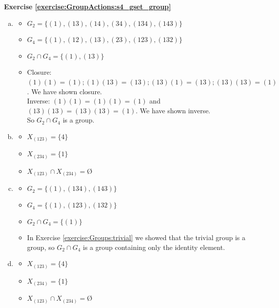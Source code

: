 \noindent\textbf{Exercise \ref{exercise:GroupActions:s4_gset_group}}
\begin{enumerate}[(a)]
\item
	\begin{itemize}
	\item
	$G_2 = \{(1), (13), (14), (34), (134), (143)\}$
	
	\item
	$G_4 = \{(1), (12), (13), (23), (123), (132)\}$
	
	\item
	$G_2 \cap G_4 = \{(1), (13)\}$
	
	\item
	Closure: $(1)(1) = (1); (1)(13) = (13); (13)(1) = (13); (13)(13) = (1)$. We have shown closure.
	\\
	Inverse: $(1)(1) = (1)(1) = (1)$ and $(13)(13) = (13)(13) = (1)$. We have shown inverse.
	\\
	So $G_2 \cap G_4$ is a group.
	\end{itemize}
	
\item
	\begin{itemize}
	\item
	$X_{(123)} = \{4\}$
	
	\item
	$X_{(234)} = \{1\}$
	
	\item
	$X_{(123)} \cap X_{(234)} = $\O{}
	\end{itemize}
	
\item
	\begin{itemize}
	\item
	$G_2 = \{(1), (134), (143)\}$
	
	\item
	$G_4 = \{(1), (123), (132)\}$
	
	\item
	$G_2 \cap G_4 = \{(1)\}$
	
	\item
	In Exercise \ref{exercise:Groups:trivial} we showed that the trivial group is a group, so $G_2 \cap G_4$ is a group containing only the identity element.
	\end{itemize}
	
\item
	\begin{itemize}
	\item
	$X_{(123)} = \{4\}$
	
	\item
	$X_{(234)} = \{1\}$
	
	\item
	$X_{(123)} \cap X_{(234)} = $\O{}
	\end{itemize}
\end{enumerate}

